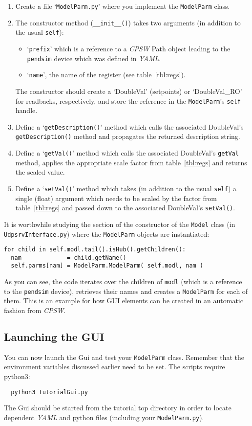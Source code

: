 \documentclass[10pt]{article}
\newcommand{\ita}[1]{\emph{#1}}
\newcommand{\cpsw}      {\ita {CPSW}}
\newcommand{\yaml}      {\ita {YAML}}
\newcommand{\Path}      {{Path}}
\newcommand{\py}        {python}
\newcommand{\pyt}       {python3}
\newcommand{\cod}[1] {{\tt#1}}
\begin{document}
\begin{enumerate}
\item Create a file `\cod{ModelParm.py}' where you implement the \cod{\mbox{ModelParm}} class.
\item The constructor method (\cod{\_\_init\_\_()}) takes two arguments (in addition
      to the usual \cod{self}):
    \begin{itemize}
    \item `\cod{prefix}' which is a reference to a \cpsw{} \Path{} object leading
          to the \cod{pendsim} device which was defined in \yaml{}.
    \item `\cod{name}', the name of the register (see table~\ref{tbl:regs}).
    \end{itemize}
    The constructor should create a `DoubleVal' (setpoints) or `DoubleVal\_RO' for
    readbacks, respectively, and store the reference in the \cod{\mbox{ModelParm}}'s
    \cod{self} handle.
\item Define a `\cod{getDescription()}' method which calls the associated DoubleVal's
    \cod{getDescription()} method and propagates the returned description string.
\item Define a `\cod{getVal()}' method which calls the associated DoubleVal's
    \cod{getVal} method, applies the appropriate scale factor from table~\ref{tbl:regs}
    and returns the scaled value.
\item Define a `\cod{setVal()}' method which takes (in addition to the usual \cod{self})
    a single (float) argument which needs to be scaled by the factor from
    table~\ref{tbl:regs} and passed down to the associated DoubleVal's \cod{setVal()}.
\end{enumerate}

It is worthwhile studying the section of the constructor of the \cod{Model} class
(in \cod{UdpsrvInterface.py}) where the \cod{\mbox{ModelParm}} objects are instantiated:
\begin{verbatim}
for child in self.modl.tail().isHub().getChildren():
  nam             = child.getName()
  self.parms[nam] = ModelParm.ModelParm( self.modl, nam )
\end{verbatim}
As you can see, the code iterates over the children of \cod{modl} (which is
a reference to the \cod{pendsim} device), retrieves their names and creates
a \cod{\mbox{ModelParm}} for each of them. This is an example for how GUI elements
can be created in an automatic fashion from \cpsw{}.

\subsection{Launching the GUI}
You can now launch the Gui and test your \cod{\mbox{ModelParm}} class. Remember that the
environment variables discussed earlier need to be set. The scripts require \pyt{}:
\begin{verbatim}
  python3 tutorialGui.py
\end{verbatim}
The Gui should be started from the tutorial top directory in order to locate
dependent \yaml{} and \py{} files (including your \cod{\mbox{ModelParm.py}}).
\end{document}
